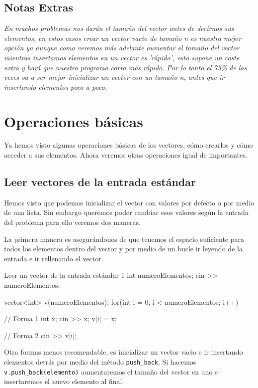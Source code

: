 \documentclass{article}
\begin{document}
    \subsection{Notas Extras}

    \textit{En muchos problemas nos darán el tamaño del vector antes de decirnos sus elementos, en estos casos crear un 
    vector vacio de tamaño n es nuestra mejor opción ya aunque como veremos más adelante aumentar el tamaño del vector mientras
    insertamos elementos en un vector es 'rápido', esto supone un coste extra y hará que nuestro programa corra más rápido. 
    Por lo tanto el 75\% de las veces  va a ser mejor inicializar un vector con un tamaño n, antes que ir insertando elementos poco a poco. }
    \pagebreak
    \section{Operaciones básicas}

    Ya hemos visto algunas operaciones básicas de los vectores, cómo crearlos y cómo acceder a sus elementos. Ahora veremos
    otras operaciones igual de importantes.

    \subsection{Leer vectores de la entrada estándar}

    Hemos visto que podemos inicializar el vector con valores por defecto o por medio de una lista. Sin embargo queremos
    poder cambiar esos valores según la entrada del problema para ello veremos dos maneras.

    La primera manera es asegurándonos de que tenemos el espacio suficiente para todos los elementos dentro del vector
    y por medio de un bucle ir leyendo de la entrada e ir rellenando el vector.

    \begin{codelisting}{Leer un vector de la entrada estándar 1}
int numeroElementos;
cin >> numeroElementos;

vector<int> v(numeroElementos);
for(int i = 0; i < numeroElementos; i++) {
    // Forma 1
    int x; 
    cin >> x; 
    v[i] = x;

    // Forma 2
    cin >> v[i];
}
    \end{codelisting}

    Otra formas menos recomendable, es inicializar un vector vacio e ir insertando elementos detrás por medio del método
    \texttt{push\_back}. Si hacemos \texttt{v.push\_back(elemento)} aumentaremos el tamaño del vector en uno e 
    insertaremos el nuevo elemento al final.
\end{document}
